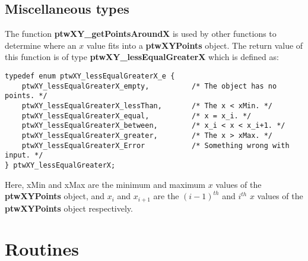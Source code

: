 \documentclass[11pt]{article}
\newcommand{\highlight}[1]{{\bf #1}}
\begin{document}
\subsection{Miscellaneous types}
The function \highlight{ptwXY\_getPointsAroundX} is used by other functions to determine
where an $x$ value fits into a \highlight{ptwXYPoints} object. The return value of this
function is of type \highlight{ptwXY\_less\-Equal\-GreaterX} which is defined as:
\begin{verbatim}
typedef enum ptwXY_lessEqualGreaterX_e {
    ptwXY_lessEqualGreaterX_empty,          /* The object has no points. */
    ptwXY_lessEqualGreaterX_lessThan,       /* The x < xMin. */
    ptwXY_lessEqualGreaterX_equal,          /* x = x_i. */
    ptwXY_lessEqualGreaterX_between,        /* x_i < x < x_i+1. */
    ptwXY_lessEqualGreaterX_greater,        /* The x > xMax. */
    ptwXY_lessEqualGreaterX_Error           /* Something wrong with input. */
} ptwXY_lessEqualGreaterX;
\end{verbatim}
Here, xMin and xMax are the minimum and maximum $x$ values of the \highlight{ptwXYPoints} object, and
$x_i$ and $x_{i+1}$ are the $(i-1)^{th}$ and $i^{th}$ $x$ values of the \highlight{ptwXYPoints} object respectively.

\section{Routines}











\end{document}
